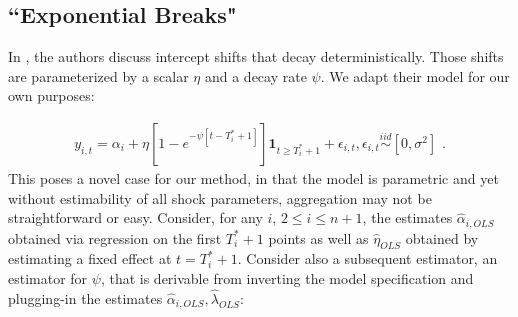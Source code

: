 \documentclass[11pt]{article}
\newcommand{\simiid}{\stackrel{iid}{\sim}} %
\theoremstyle{definition}
\begin{document}



\subsection{``Exponential Breaks"}
In \cite{castle2011forecasting}, the authors discuss intercept shifts that decay deterministically.  Those shifts are parameterized by a scalar $\eta$ and a decay rate $\psi$.  We adapt their model for our own purposes:

\begin{align}
y_{i,t} = \alpha_{i} + \eta[1 - e^{-\psi[t-T_{i}^{*}+1]}]\textbf{1}_{t\geq T_{i}^{*}+1} + \epsilon_{i,t}, \epsilon_{i,t} \simiid [0,\sigma^{2}] \text{ .}\label{decay_model}
\end{align}
This poses a novel case for our method, in that the model is parametric and yet without estimability of all shock parameters, aggregation may not be straightforward or easy.  Consider, for any $i$, $2 \leq i \leq n+1$, the estimates $\hat\alpha_{i,OLS}$  obtained via regression on the first $T_{i}^{*}+1$ points as well as $\hat\eta_{OLS}$ obtained by estimating a fixed effect at $t=T_{i}^{*}+1$.  Consider also a subsequent estimator, an estimator for $\psi$, that is derivable from inverting the model specification and plugging-in the estimates  $\hat\alpha_{i,OLS},\hat\lambda_{OLS}$:
\end{document}
